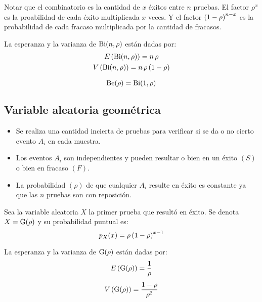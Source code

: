 Notar que el combinatorio es la cantidad de $x$ éxitos entre $n$ pruebas.
El factor $\rho^x$ es la proabilidad de cada éxito multiplicada $x$ veces.
Y el factor $\left(1-\rho\right)^{n-x}$ es la probabilidad de cada fracaso multiplicada por la cantidad de fracasos.

La esperanza y la varianza de $\operatorname{Bi}(n,\rho)$ están dadas por:
\begin{gather*}
    E \left(\operatorname{Bi}(n,\rho)\right) = n \, \rho
    \\
    V \left(\operatorname{Bi}(n,\rho)\right) = n \, \rho \left(1-\rho\right)
\end{gather*}

\begin{mdframed}[style=DefinitionFrame]
    \begin{defn}
    \end{defn}
    \begin{equation*}
        \operatorname{Be}(\rho) = \operatorname{Bi}(1,\rho)
    \end{equation*}
\end{mdframed}


\subsection{Variable aleatoria geométrica}

\begin{itemize}
\item Se realiza una cantidad incierta de pruebas para verificar si se da o no cierto evento $A_i$ en cada muestra.

\item Los eventos $A_i$ son independientes y pueden resultar o bien en un éxito $(S)$ o bien en fracaso $(F)$.

\item La probabilidad $(\rho)$ de que cualquier $A_i$ resulte en éxito es constante ya que las $n$ pruebas son con reposición.
\end{itemize}

Sea la variable aleatoria $X$ la primer prueba que resultó en éxito.
Se denota $X=\operatorname{G}(\rho)$ y su probabilidad puntual es:
\begin{equation*}
    p_X(x) = \rho \left(1-\rho\right)^{x-1}
\end{equation*}

La esperanza y la varianza de $\operatorname{G}(\rho)$ están dadas por:
\begin{gather*}
    E \left(\operatorname{G}(\rho)\right) = \frac{1}{\rho}
    \\[1ex]
    V \left(\operatorname{G}(\rho)\right) = \frac{1-\rho}{\rho^2}
\end{gather*}


